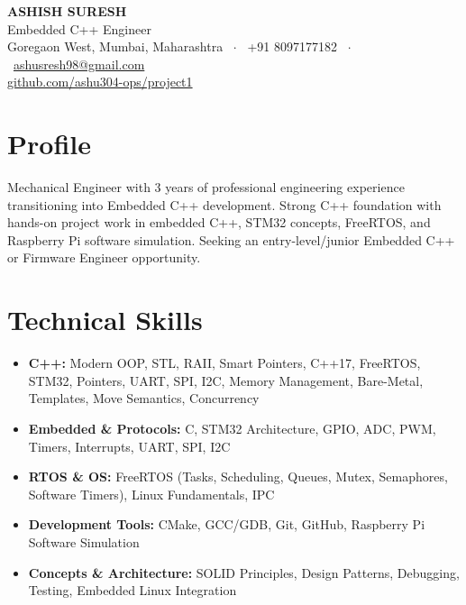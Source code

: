 \documentclass[10pt, a4paper]{article}
\begin{document}
\begin{center}
    {\Huge \textbf{ASHISH SURESH}} \\[4pt]
    Embedded C++ Engineer \\[2pt]
    Goregaon West, Mumbai, Maharashtra \ $\cdot$ \ +91 8097177182 \ $\cdot$ \ \href{mailto:ashusresh98@gmail.com}{ashusresh98@gmail.com} \\
    \href{https://github.com/ashu304-ops/project1}{github.com/ashu304-ops/project1}
\end{center}

\section{Profile}
Mechanical Engineer with 3 years of professional engineering experience transitioning into Embedded C++ development. Strong C++ foundation with hands-on project work in embedded C++, STM32 concepts, FreeRTOS, and Raspberry Pi software simulation. Seeking an entry-level/junior Embedded C++ or Firmware Engineer opportunity.

\section{Technical Skills}
\begin{itemize}
    \item \textbf{C++:} Modern OOP, STL, RAII, Smart Pointers, C++17, FreeRTOS, STM32, Pointers, UART, SPI, I2C, Memory Management, Bare-Metal, Templates, Move Semantics, Concurrency
    \item \textbf{Embedded \& Protocols:} C, STM32 Architecture, GPIO, ADC, PWM, Timers, Interrupts, UART, SPI, I2C
    \item \textbf{RTOS \& OS:} FreeRTOS (Tasks, Scheduling, Queues, Mutex, Semaphores, Software Timers), Linux Fundamentals, IPC
    \item \textbf{Development Tools:} CMake, GCC/GDB, Git, GitHub, Raspberry Pi Software Simulation
    \item \textbf{Concepts \& Architecture:} SOLID Principles, Design Patterns, Debugging, Testing, Embedded Linux Integration
\end{itemize}
\end{document}
